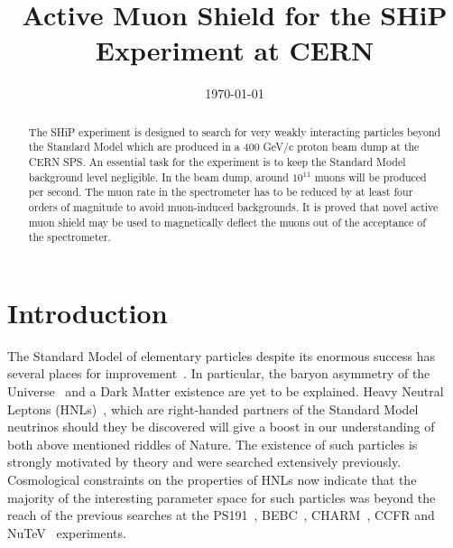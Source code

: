 \documentclass[a4paper]{jpconf}
\theoremstyle{my_theorem_style}
\numberwithin{equation}{section}
\begin{document}
\title{Active Muon Shield for the SHiP Experiment at CERN}
\author{}
\address{Yandex School of Data Analysis, Higher School of Economics, Imperial College London, Skoltech}
\ead{}

\begin{abstract}
The SHiP experiment is designed to search for very weakly interacting particles beyond the Standard Model which are produced in a 400 GeV/c proton beam dump at the CERN SPS. An essential task for the experiment is to keep the Standard Model background level negligible. In the beam dump, around $10^{11}$ muons will be produced per second. The muon rate in the spectrometer has to be reduced by at least four orders of magnitude to avoid muon-induced backgrounds. It is proved that novel active muon shield may be used to magnetically deflect the muons out of the acceptance of the spectrometer.
\end{abstract}

\date{\today}



\section{Introduction}
\label{intro}
The Standard Model of elementary particles despite its enormous success has several places for improvement~\cite{Ellis:2009tp}. In particular, the baryon asymmetry of the Universe~\cite{Asaka:2005pn} and a Dark Matter existence are yet to be explained. Heavy Neutral Leptons (HNLs)~\cite{Asaka:2005an}, which are right-handed partners of the Standard Model neutrinos should they be discovered will give a boost in our understanding of both above mentioned riddles of Nature. The existence of such particles is strongly motivated by theory and were searched extensively previously. Cosmological constraints on the properties of HNLs now indicate that the majority of the interesting parameter space for such particles was beyond the reach of the previous searches at the PS191~\cite{Bernardi:1985ny}, BEBC~\cite{CooperSarkar:1985nh}, CHARM~\cite{Bergsma:1985is}, CCFR and NuTeV~\cite{Vaitaitis:1999wq} experiments. 
\end{document}
